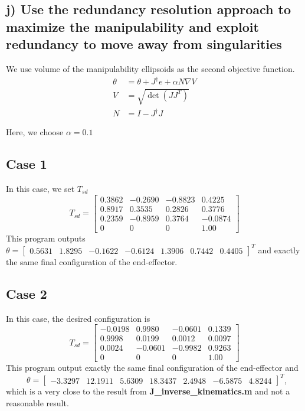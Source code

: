\documentclass[english,10pt,a4paper]{article}
\begin{document}
    \subsection*{j) Use the redundancy resolution approach to maximize the manipulability and exploit redundancy to move away from singularities}
    We use volume of the manipulability ellipsoids as the second objective function.
    \begin{align}
    	\theta &= \theta + J^\dagger e + \alpha N \nabla V\\ \nonumber
    	V &= \sqrt{\det(J J^T)} \\
    	N &= I - J^\dagger J
    \end{align}
	
	Here, we choose $\alpha = 0.1$
	\subsection*{Case 1}
	In this case, we set $T_{sd}$
	\begin{equation}
		T_{sd} = \begin{bmatrix}
			0.3862 & -0.2690 & -0.8823 & 0.4225\\
			0.8917 & 0.3535 & 0.2826 & 0.3776\\
			0.2359 & -0.8959 & 0.3764 &  -0.0874\\
			0 & 0 & 0 & 1.00
		\end{bmatrix}
	\end{equation}
	This program outputs \(\theta = \begin{bmatrix} 0.5631 & 1.8295 & -0.1622 & -0.6124 & 1.3906 & 0.7442 & 0.4405 \end{bmatrix}^T\) and exactly the same final configuration of the end-effector.
	
	\subsection*{Case 2}
	In this case, the desired configuration is
	\begin{equation}
		T_{sd} = \begin{bmatrix}
			-0.0198 & 0.9980 & -0.0601 & 0.1339\\
			0.9998 & 0.0199 & 0.0012 & 0.0097\\
			0.0024 & -0.0601 & -0.9982 & 0.9263\\
			0 & 0 & 0 & 1.00
		\end{bmatrix}
	\end{equation}
	This program output exactly the same final configuration of the end-effector and \ \ \ \ \ \(\theta = \begin{bmatrix} -3.3297 & 12.1911 & 5.6309 & 18.3437 & 2.4948 & -6.5875 & 4.8244 \end{bmatrix}^T\), which is a very close to the result from \textbf{J\_inverse\_kinematics.m} and not a reasonable result.
	
\end{document}

